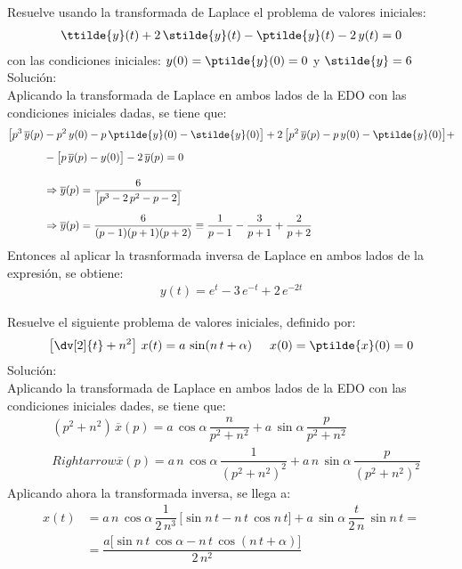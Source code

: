 \begin{ejemplo}
Resuelve usando la transformada de Laplace el problema de valores iniciales:
\begin{align*}
\ttilde{y}(t) +  2 \, \stilde{y} (t) - \ptilde{y}(t) - 2 \, y(t) = 0
\end{align*}
con las condiciones iniciales: $y(0) = \ptilde{y}(0) = 0$ y $\stilde{y} = 6$
\noindent Solución:
\\[0.5em]
Aplicando la transformada de Laplace en ambos lados de la EDO con las condiciones iniciales dadas, se tiene que:
\begin{align*}
\big[p^{3} \, \overline{y}(p) &- p^{2} \, y(0) - p \, \ptilde{y}(0) - \stilde{y}(0) \big] + 2 \, \big[p^{2} \, \overline{y}(p) - p \, y(0) - \ptilde{y}(0) \big] + \\[0.5em]
&- \big[p \, \overline{y}(p) - y(0) \big] - 2 \, \overline{y}(p) = 0 \\[1em]
&\Rightarrow \overline{y}(p) = \dfrac{6}{\big[p^{3} - 2 \, p^{2} - p -2 \big]} \\[0.5em]
&\Rightarrow \overline{y}(p) = \dfrac{6}{(p - 1)(p + 1)(p +2)} \equiv \dfrac{1}{p - 1} - \dfrac{3}{p + 1} + \dfrac{2}{p + 2}  
\end{align*}
Entonces al aplicar la trasnformada inversa de Laplace en ambos lados de la expresión, se obtiene:
\begin{align*}
y(t) = e^{t} - 3 \, e^{-t} + 2 \, e^{- 2 t}
\end{align*}
\end{ejemplo}
\begin{ejemplo}
Resuelve el siguiente problema de valores iniciales, definido por:
\begin{align*}
\left[ \dv[2]{t} + n^{2}\right] \, x(t) = a \, \sin (n \, t +  \alpha) \hspace{0.5cm} x(0) = \ptilde{x}(0) = 0
\end{align*}
\noindent Solución:
\\[0.5em]
Aplicando la transformada de Laplace en ambos lados de la EDO con las condiciones iniciales dades, se tiene que:
\begin{align*}
&(p^{2} + n^{2}) \, \overline{x}(p) = a \, \cos \alpha \, \dfrac{n}{p^{2} + n^{2}} +  a \, \sin \alpha \, \dfrac{p}{p^{2} + n^{2}} \\[0.5em]
&Rightarrow \overline{x}(p) = a \, n \, \cos \alpha \, \dfrac{1}{(p^{2} + n^{2})^{2}} + a \, n \, \sin \alpha \, \dfrac{p}{(p^{2} + n^{2})^{2}}
\end{align*}
Aplicando ahora la transformada inversa, se llega a:
\begin{align*}
x(t) &= a \, n \, \cos \alpha \, \dfrac{1}{2 \, n^{3}} \, \big[\sin n \, t - n \, t \, \cos n \, t \big] + a \, \sin \alpha \, \dfrac{t}{2 \, n} \, \sin n \, t = \\[0.5em]
&= \dfrac{a \big[\sin n \, t \, \cos \alpha - n \, t \, \cos (n \, t +  \alpha)]}{2 \, n^{2}}
\end{align*}
\end{ejemplo}
